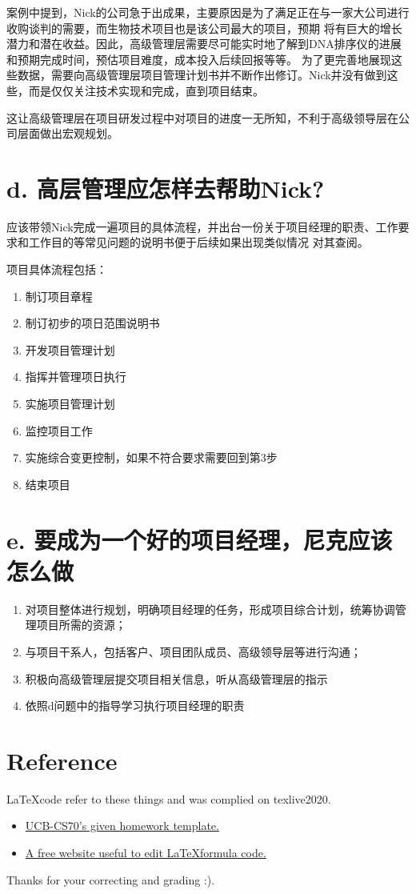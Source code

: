 \documentclass[11pt]{article}  %
\begin{document}
案例中提到，Nick的公司急于出成果，主要原因是为了满足正在与一家大公司进行收购谈判的需要，而生物技术项目也是该公司最大的项目，预期
将有巨大的增长潜力和潜在收益。因此，高级管理层需要尽可能实时地了解到DNA排序仪的进展和预期完成时间，预估项目难度，成本投入后续回报等等。
为了更完善地展现这些数据，需要向高级管理层项目管理计划书并不断作出修订。Nick并没有做到这些，而是仅仅关注技术实现和完成，直到项目结束。

这让高级管理层在项目研发过程中对项目的进度一无所知，不利于高级领导层在公司层面做出宏观规划。

\section*{d. 高层管理应怎样去帮助Nick? }

应该带领Nick完成一遍项目的具体流程，并出台一份关于项目经理的职责、工作要求和工作目的等常见问题的说明书便于后续如果出现类似情况
对其查阅。

项目具体流程包括：
\begin{enumerate}
    \item 制订项目章程
    \item 制订初步的项日范围说明书
    \item 开发项目管理计划
    \item 指挥并管理项日执行
    \item 实施项目管理计划
    \item 监控项目工作
    \item 实施综合变更控制，如果不符合要求需要回到第3步
    \item 结束项目
\end{enumerate}

\section*{e. 要成为一个好的项目经理，尼克应该怎么做}

\begin{enumerate}
    \item 对项目整体进行规划，明确项目经理的任务，形成项目综合计划，统筹协调管理项目所需的资源；
    \item 与项目干系人，包括客户、项目团队成员、高级领导层等进行沟通；
    \item 积极向高级管理层提交项目相关信息，听从高级管理层的指示
    \item 依照d问题中的指导学习执行项目经理的职责
\end{enumerate}

\section*{Reference}

    \LaTeX \space code refer to these things and was complied on texlive2020.
    \begin{itemize}
        \item  \href{https://www.eecs70.org/assets/misc/homework_template.tex}{UCB-CS70's given homework template.} 
        \item  \href{https://www.latexlive.com}{A free website useful to edit \LaTeX \space formula code.}
    \end{itemize}

    Thanks for your correcting and grading :).
\end{document}
